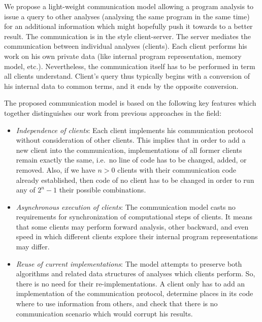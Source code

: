 \documentclass[envcountsame]{llncs}
\begin{document}
We propose a light-weight communication model allowing a program analysis to
issue a query to other analyses (analysing the same program in the same time)
for an additional information which might hopefully push it towards to a better
result. The communication is in the style client-server. The server mediates the
communication between individual analyses (clients). Each client performs his
work on his own private data (like internal program representation, memory
model, etc.). Nevertheless, the communication itself has to be performed in term
all clients understand. Client's query thus typically begins with a conversion
of his internal data to common terms, and it ends by the opposite conversion.

The proposed communication model is based on the following key features which
together distinguishes our work from previous approaches in the field: \begin{itemize}
\item \emph{Independence of clients}: Each client implements his communication
protocol without consideration of other clients. This implies that in order to
add a new client into the communication, implementations of all former clients
remain exactly the same, i.e.~no line of code has to be changed, added, or
removed. Also, if we have $ n > 0 $ clients with their communication code
already established, then code of no client has to be changed in order to run
any of $ 2^n - 1 $ their possible combinations. \item \emph{Asynchronous execution of clients}: The communication model casts no
requirements for synchronization of computational steps of clients. It means
that some clients may perform forward analysis, other backward, and even speed
in which different clients explore their internal program representations may
differ. \item \emph{Reuse of current implementations}: The model attempts to preserve
both algorithms and related data structures of analyses which clients perform.
So, there is no need for their re-implementations. A client only has to add an
implementation of the communication protocol, determine places in its code where
to use information from others, and check that there is no communication
scenario which would corrupt his results.
\end{itemize}
\end{document}
